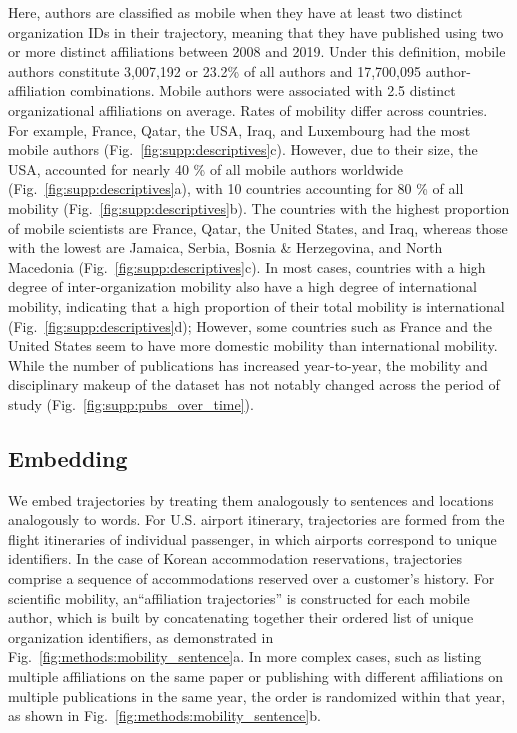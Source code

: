 \documentclass[12pt]{article} %
\begin{document}
Here, authors are classified as mobile when they have at least two distinct organization IDs in their trajectory, meaning that they have published using two or more distinct affiliations between 2008 and 2019.
Under this definition, mobile authors constitute 3,007,192 or 23.2\% of all authors and 17,700,095 author-affiliation combinations.
Mobile authors were associated with 2.5 distinct organizational affiliations on average.
Rates of mobility differ across countries.
For example, France, Qatar, the USA, Iraq, and Luxembourg had the most mobile authors (Fig.~\ref{fig:supp:descriptives}c).
However, due to their size, the USA, accounted for nearly 40 \% of all mobile authors worldwide (Fig.~\ref{fig:supp:descriptives}a), with 10 countries accounting for 80 \% of all mobility (Fig.~\ref{fig:supp:descriptives}b).
The countries with the highest proportion of mobile scientists are France, Qatar, the United States, and Iraq, whereas those with the lowest are Jamaica, Serbia, Bosnia \& Herzegovina, and North Macedonia (Fig.~\ref{fig:supp:descriptives}c).
In most cases, countries with a high degree of inter-organization mobility also have a high degree of international mobility, indicating that a high proportion of their total mobility is international (Fig.~\ref{fig:supp:descriptives}d);
However, some countries such as France and the United States seem to have more domestic mobility than international mobility.
While the number of publications has increased year-to-year, the mobility and disciplinary makeup of the dataset has not notably changed across the period of study (Fig.~\ref{fig:supp:pubs_over_time}).


\subsection*{Embedding}

We embed trajectories by treating them analogously to sentences and locations analogously to words.
For U.S. airport itinerary, trajectories are formed from the flight itineraries of individual passenger, in which airports correspond to unique identifiers.
In the case of Korean accommodation reservations, trajectories comprise a sequence of accommodations reserved over a customer's history.
For scientific mobility, an``affiliation trajectories'' is constructed for each mobile author, which is built by concatenating together their ordered list of unique organization identifiers, as demonstrated in Fig.~\ref{fig:methods:mobility_sentence}a.
In more complex cases, such as listing multiple affiliations on the same paper or publishing with different affiliations on multiple publications in the same year, the order is randomized within that year, as shown in Fig.~\ref{fig:methods:mobility_sentence}b.
\end{document}
